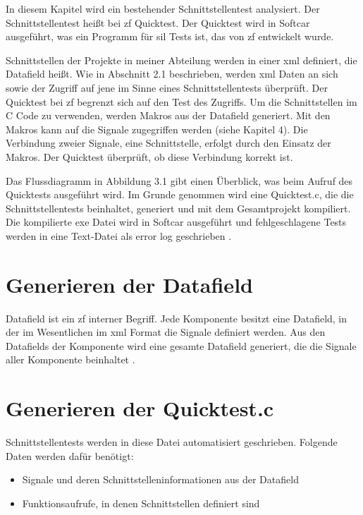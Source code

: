 In diesem Kapitel wird ein bestehender Schnittstellentest analysiert. Der Schnittstellentest heißt bei \ac{zf} Quicktest.
Der Quicktest wird in Softcar ausgeführt, was ein Programm für \ac{sil} Tests ist, das von \ac{zf} entwickelt wurde.

Schnittstellen der Projekte in meiner Abteilung werden in einer \ac{xml} definiert, die Datafield heißt.
Wie in Abschnitt 2.1 beschrieben, werden \ac{xml} Daten an sich sowie der Zugriff auf jene im Sinne eines Schnittstellentests
überprüft. Der Quicktest bei \ac{zf} begrenzt sich auf den Test des Zugriffs. Um die Schnittstellen im C Code zu
verwenden, werden Makros aus der Datafield generiert. Mit den Makros kann auf die Signale zugegriffen werden (siehe Kapitel 4).
Die Verbindung zweier Signale, eine Schnittstelle, erfolgt durch den Einsatz der Makros. Der Quicktest überprüft, ob
diese Verbindung korrekt ist.

Das Flussdiagramm in Abbildung 3.1 gibt einen Überblick, was beim Aufruf des Quicktests ausgeführt wird.
Im Grunde genommen wird eine Quicktest.c, die die Schnittstellentests beinhaltet, generiert und mit dem Gesamtprojekt kompiliert. 
Die kompilierte \ac{exe} Datei wird in Softcar ausgeführt und fehlgeschlagene Tests
werden in eine Text-Datei als error log geschrieben \cite[vgl.][]{quicktestc}\cite[vgl.][]{quicktestlog}\cite[vgl.][]{datafield}.


\newpage
\section*{Generieren der Datafield}
Datafield ist ein \ac{zf} interner Begriff. Jede Komponente besitzt eine Datafield, in der im Wesentlichen im \ac{xml} Format die Signale definiert werden.
Aus den Datafields der Komponente wird eine gesamte Datafield generiert, die die Signale aller Komponente beinhaltet \cite[vgl.][]{datafield}.

\section*{Generieren der Quicktest.c}
Schnittstellentests werden in diese Datei automatisiert geschrieben.
Folgende Daten werden dafür benötigt:
\begin{itemize}
\item Signale und deren Schnittstelleninformationen aus der Datafield \cite[vgl.][]{datafield}%
\item Funktionsaufrufe, in denen Schnittstellen definiert sind
\end{itemize}

